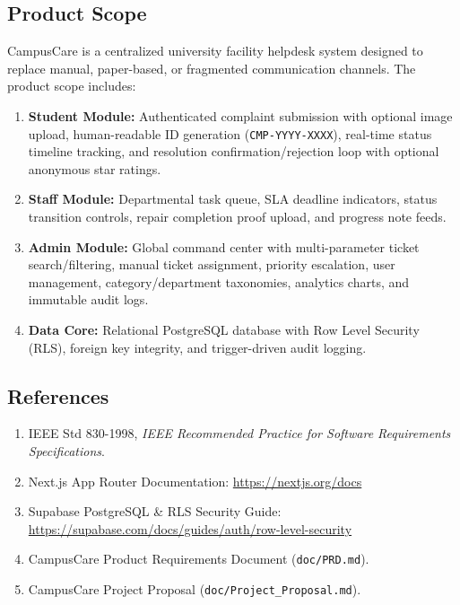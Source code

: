 \documentclass[12pt, a4paper]{article}
\begin{document}
\subsection{Product Scope}
CampusCare is a centralized university facility helpdesk system designed to replace manual, paper-based, or fragmented communication channels. The product scope includes:
\begin{enumerate}[leftmargin=*]
    \item \textbf{Student Module:} Authenticated complaint submission with optional image upload, human-readable ID generation (\texttt{CMP-YYYY-XXXX}), real-time status timeline tracking, and resolution confirmation/rejection loop with optional anonymous star ratings.
    \item \textbf{Staff Module:} Departmental task queue, SLA deadline indicators, status transition controls, repair completion proof upload, and progress note feeds.
    \item \textbf{Admin Module:} Global command center with multi-parameter ticket search/filtering, manual ticket assignment, priority escalation, user management, category/department taxonomies, analytics charts, and immutable audit logs.
    \item \textbf{Data Core:} Relational PostgreSQL database with Row Level Security (RLS), foreign key integrity, and trigger-driven audit logging.
\end{enumerate}

\subsection{References}
\begin{enumerate}[leftmargin=*]
    \item IEEE Std 830-1998, \textit{IEEE Recommended Practice for Software Requirements Specifications}.
    \item Next.js App Router Documentation: \url{https://nextjs.org/docs}
    \item Supabase PostgreSQL \& RLS Security Guide: \url{https://supabase.com/docs/guides/auth/row-level-security}
    \item CampusCare Product Requirements Document (\texttt{doc/PRD.md}).
    \item CampusCare Project Proposal (\texttt{doc/Project\_Proposal.md}).
\end{enumerate}

\end{document}
